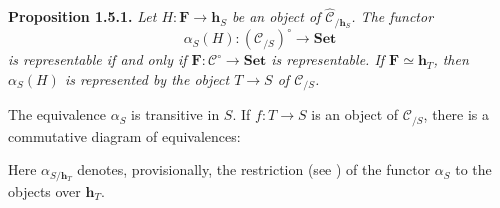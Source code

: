 \medskip
\noindent{}\textbf{Proposition 1.5.1.}
\textit{Let \(H:\mathbf F\to\mathbf h_S\) be an object of
\(\widehat{\mathscr C}_{/\mathbf h_S}\). The functor
\[
  \alpha_S(H):(\mathscr C_{/S})^{\circ}\longrightarrow\mathbf{Set}
\]
is representable if and only if
\(\mathbf F:\mathscr C^{\circ}\to\mathbf{Set}\) is representable. If
\(\mathbf F\simeq\mathbf h_T\), then \(\alpha_S(H)\) is represented by the
object \(T\to S\) of \(\mathscr C_{/S}\).}

The equivalence \(\alpha_S\) is transitive in \(S\). If \(f:T\to S\) is an
object of \(\mathscr C_{/S}\), there is a commutative diagram of
equivalences:

\begin{center}
  
\end{center}

Here \(\alpha_{S/\mathbf h_T}\) denotes, provisionally, the restriction
(see ) of the functor \(\alpha_S\) to the objects over
\(\mathbf h_T\).

